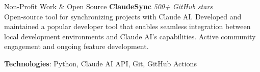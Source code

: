\documentclass{resume}
\begin{document}
\begin{rSection}{Non-Profit Work \& Open Source}
{\bf ClaudeSync}
\hfill {\em 500+ GitHub stars } \\
{ Open-source tool for synchronizing projects with Claude AI. Developed and maintained a popular developer tool that enables seamless integration between local development environments and Claude AI's capabilities. Active community engagement and ongoing feature development. }

{\bf Technologies}: Python, Claude AI API, Git, GitHub Actions
\end{rSection}
\end{document}
